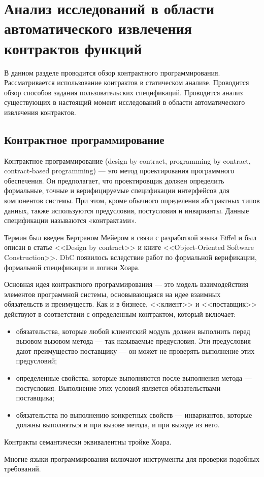 \chapter{Анализ исследований в области автоматического извлечения контрактов функций}
В данном разделе проводится обзор контрактного программирования. Рассматривается использование контрактов в статическом анализе. Проводится обзор способов задания пользовательских спецификаций. Проводится анализ существующих в настоящий момент исследований в области автоматического извлечения контрактов.

\section{Контрактное программирование}
Контрактное программирование (design by contract, programming by contract, contract-based programming) --- это метод проектирования программного обеспечения. Он предполагает, что проектировщик должен определить формальные, точные и верифицируемые спецификации интерфейсов для компонентов системы. При этом, кроме обычного определения абстрактных типов данных, также используются предусловия, постусловия и инварианты. Данные спецификации называются «контрактами».

Термин был введен Бертраном Мейером в связи с разработкой языка Eiffel и был описан в статье <<Design by contract>>\cite{designByContract} и книге <<Object-Oriented Software Construction>>\cite{oosc-meyer}. DbC появилось вследствие работ по формальной верификации, формальной спецификации и логики Хоара.

Основная идея контрактного программирования --- это модель взаимодействия элементов программной системы, основывающаяся на идее взаимных обязательств и преимуществ. Как и в бизнесе, <<клиент>> и <<поставщик>> действуют в соответствии с определенным контрактом, который включает:
\begin{itemize}
\item обязательства, которые любой клиентский модуль должен выполнить перед вызовом вызовом метода --- так называемые предусловия. Эти предусловия дают преимущество поставщику --- он может не проверять выполнение этих предусловий;
\item определенные свойства, которые выполняются после выполнения метода --- постусловия. Выполнение этих условий является обязательствами поставщика;
\item обязательства по выполнению конкретных свойств --- инвариантов, которые должны выполняться и при вызове метода, и при выходе из него.
\end{itemize}

Контракты семантически эквивалентны тройке Хоара.

Многие языки программирования включают инструменты для проверки подобных требований.